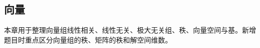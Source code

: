 \subsection{向量}

\begin{knowledgeBox}
本章用于整理向量组线性相关、线性无关、极大无关组、秩、向量空间与基。新增题目时重点区分向量组的秩、矩阵的秩和解空间维数。
\end{knowledgeBox}
